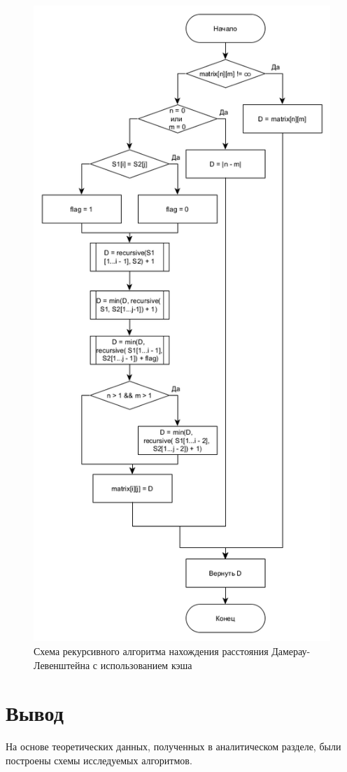 \begin{figure}[h]
	\centering
	\includegraphics[scale = 0.6]{img/damercache.png}
	\caption{Схема рекурсивного алгоритма нахождения расстояния Дамерау-Левенштейна с использованием кэша}
	\label{fig:damercache}
\end{figure}
\clearpage


\section*{Вывод}
На основе теоретических данных, полученных в аналитическом разделе, были построены схемы исследуемых алгоритмов.